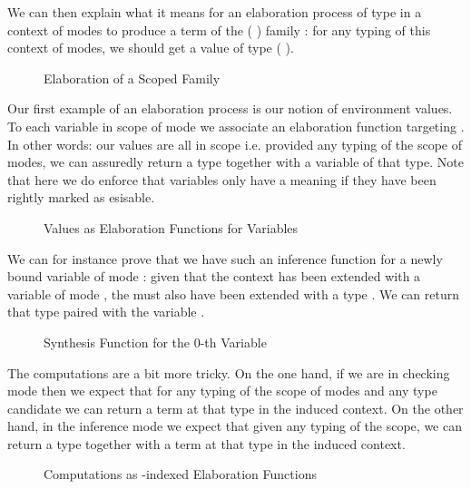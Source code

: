 We can then explain what it means for an elaboration process of type 
in a context of modes  to produce a term of the
({ }) family : for any typing  of this
context of modes, we should get a value of type
{(    )}.

\begin{figure}[h]
\caption{Elaboration of a Scoped Family}
\end{figure}

Our first example of an elaboration process is our notion of environment
values. To each variable in scope of mode  we associate an
elaboration function targeting . In other words: our values are
all in scope i.e. provided any typing of the scope of modes, we can
assuredly return a type together with a variable of that type. Note that
here we do enforce that variables only have a meaning if they have been
rightly marked as esisable.

\begin{figure}[h!]
\caption{Values as Elaboration Functions for Variables\label{fig:elabvalues}}
\end{figure}

We can for instance prove that we have such an inference function for a
newly bound variable of mode : given that the context has been
extended with a variable of mode , the  must also
have been extended with a type . We can return that type paired with
the variable .

\begin{figure}[h]
\caption{Synthesis Function for the 0-th Variable\label{fig:elabvar0}}
\end{figure}

The computations are a bit more tricky. On the one hand, if we are in
checking mode then we expect that for any typing of the scope of modes
and any type candidate we can  return a term at that type
in the induced context. On the other hand, in the inference mode we
expect that given any typing of the scope, we can  return
a type together with a term at that type in the induced context.

\begin{figure}[h]
\caption{Computations as -indexed Elaboration Functions\label{fig:elabcomputations}}
\end{figure}

